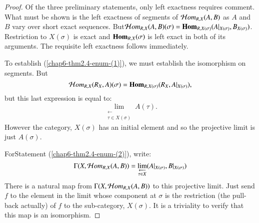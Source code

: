 \begin{proof}
Of the three preliminary statements, only left exactness requires comment. What must be shown is the left exactness of segments of $\mathcal{H} om_{R, X}(A, B)$ as $A$ and $B$ vary over short exact sequences. But\break $\mathcal{H} om_{R, X}(A, B)(\sigma) = \operatorname{\mathbf{Hom}}_{R,X(\sigma)}(A|_{X(\sigma)}, B_{X(\sigma)})$. Restriction to $X(\sigma)$ is exact and $\operatorname{\mathbf{Hom}}_{R, X}(\sigma)$ is left exact in both of its arguments. The requisite left exactness follows immediately.

To establish (\ref{chap6-thm2.4-enum-(1)}), we must establish the isomorphism on segments. But
$$
\mathcal{H} om_{R, X}(R_{X}, A)(\sigma) = \operatorname{\mathbf{Hom}}_{R,X(\sigma)}(R_{X}, A|_{X(\sigma)}),
$$
but this last expression is equal to:
$$
\lim_{\substack{\longleftarrow \\ \tau \in X(\sigma)}}A(\tau).
$$
However the category, $X(\sigma)$ has an initial element and so the projective limit is just $A(\sigma)$.

For\pageoriginale Statement (\ref{chap6-thm2.4-enum-(2)}), write:
$$
\Gamma(X, \mathcal{H} om_{R,X}(A, B)) = \lim_{\substack{\longleftarrow \\ \tau \in X}}(A|_{X(\sigma)}, B|_{X(\sigma)})
$$
There is a natural map from $\Gamma(X, \mathcal{H} om_{R,X}(A, B))$ to this projective limit. Just send $f$ to the element in the limit whose component at $\sigma$ is the restriction (the pull-back actually) of $f$ to the sub-category, $X(\sigma)$. It is a triviality to verify that this map is an isomorphism.


\end{proof}
